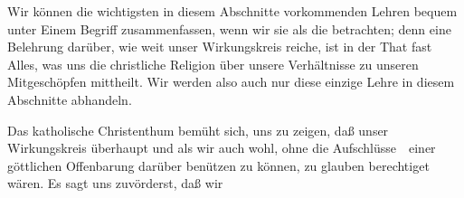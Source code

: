 Wir können die wichtigsten in diesem Abschnitte vorkommenden Lehren bequem unter Einem Begriff zusammenfassen, wenn wir sie als die  betrachten; denn eine Belehrung darüber, wie weit unser Wirkungskreis reiche, ist in der That fast Alles, was uns die christliche Religion über unsere Verhältnisse zu unseren Mitgeschöpfen mittheilt. Wir werden also auch nur diese einzige Lehre in diesem Abschnitte abhandeln.

Das katholische Christenthum bemüht sich, uns zu zeigen, daß unser Wirkungskreis überhaupt  und als wir auch wohl, ohne die Aufschlüsse~\ einer göttlichen Offenbarung darüber benützen zu können, zu glauben berechtiget wären. Es sagt uns zuvörderst, daß wir
